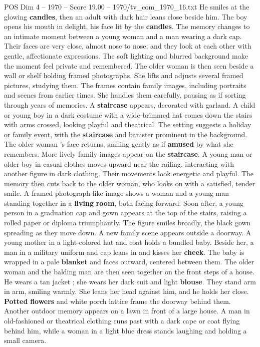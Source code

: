 \begin{textsample}{POS Dim 4 – 1970 – Score 19.00 – 1970/tv\_com\_1970\_16.txt}
He smiles at the glowing \textbf{candles}, then an adult with dark hair leans close beside him.
The boy opens his mouth in delight, his face lit by the \textbf{candles}.
The memory changes to an intimate moment between a young woman and a man wearing a dark cap.
Their faces are very close, almost nose to nose, and they look at each other with gentle, affectionate expressions.
The soft lighting and blurred background make the moment feel private and remembered.
The older woman is then seen beside a wall or shelf holding framed photographs.
She lifts and adjusts several framed pictures, studying them.
The frames contain family images, including portraits and scenes from earlier times.
She handles them carefully, pausing as if sorting through years of memories.
A \textbf{staircase} appears, decorated with garland.
A child or young boy in a dark costume with a wide-brimmed hat comes down the stairs with arms crossed, looking playful and theatrical.
The setting suggests a holiday or family event, with the \textbf{staircase} and banister prominent in the background.
The older woman ’s face returns, smiling gently as if \textbf{amused} by what she remembers.
More lively family images appear on the \textbf{staircase}.
A young man or older boy in casual clothes moves upward near the railing, interacting with another figure in dark clothing.
Their movements look energetic and playful.
The memory then cuts back to the older woman, who looks on with a satisfied, tender smile.
A framed photograph-like image shows a woman and a young man standing together in a \textbf{living} \textbf{room}, both facing forward.
Soon after, a young person in a graduation cap and gown appears at the top of the stairs, raising a rolled paper or diploma triumphantly.
The figure smiles broadly, the black gown spreading as they move down.
A new family scene appears outside a doorway.
A young mother in a light-colored hat and coat holds a bundled baby.
Beside her, a man in a military uniform and cap leans in and kisses her \textbf{cheek}.
The baby is wrapped in a pale \textbf{blanket} and faces outward, centered between them.
The older woman and the balding man are then seen together on the front steps of a house.
He wears a tan jacket ; she wears her dark suit and light \textbf{blouse}.
They stand arm in arm, smiling warmly.
She leans her head against him, and he holds her close. \textbf{Potted} \textbf{flowers} and white porch lattice frame the doorway behind them.
Another outdoor memory appears on a lawn in front of a large house.
A man in old-fashioned or theatrical clothing runs past with a dark cape or coat flying behind him, while a woman in a light blue dress stands laughing and holding a small camera.

\end{textsample}
